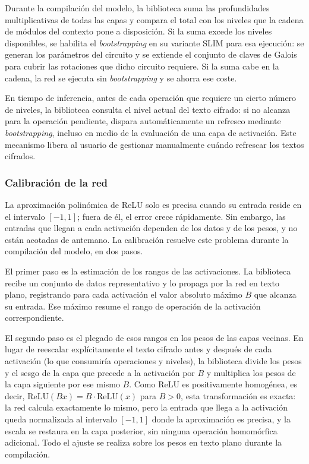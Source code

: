 Durante la compilación del modelo, la biblioteca suma las profundidades multiplicativas de todas las capas y compara el total con los niveles que la cadena de módulos del contexto pone a disposición. Si la suma excede los niveles disponibles, se habilita el \textit{bootstrapping} en su variante SLIM para esa ejecución: se generan los parámetros del circuito y se extiende el conjunto de claves de Galois para cubrir las rotaciones que dicho circuito requiere. Si la suma cabe en la cadena, la red se ejecuta sin \textit{bootstrapping} y se ahorra ese coste.

En tiempo de inferencia, antes de cada operación que requiere un cierto número de niveles, la biblioteca consulta el nivel actual del texto cifrado: si no alcanza para la operación pendiente, dispara automáticamente un refresco mediante \textit{bootstrapping}, incluso en medio de la evaluación de una capa de activación. Este mecanismo libera al usuario de gestionar manualmente cuándo refrescar los textos cifrados.

\subsubsection{Calibración de la red}\label{sec:metodo_calibracion}

La aproximación polinómica de ReLU solo es precisa cuando su entrada reside en el intervalo $[-1, 1]$; fuera de él, el error crece rápidamente. Sin embargo, las entradas que llegan a cada activación dependen de los datos y de los pesos, y no están acotadas de antemano. La calibración resuelve este problema durante la compilación del modelo, en dos pasos.

El primer paso es la estimación de los rangos de las activaciones. La biblioteca recibe un conjunto de datos representativo y lo propaga por la red en texto plano, registrando para cada activación el valor absoluto máximo $B$ que alcanza su entrada. Ese máximo resume el rango de operación de la activación correspondiente.

El segundo paso es el plegado de esos rangos en los pesos de las capas vecinas. En lugar de reescalar explícitamente el texto cifrado antes y después de cada activación (lo que consumiría operaciones y niveles), la biblioteca divide los pesos y el sesgo de la capa que precede a la activación por $B$ y multiplica los pesos de la capa siguiente por ese mismo $B$. Como ReLU es positivamente homogénea, es decir, $\mathrm{ReLU}(Bx) = B \cdot \mathrm{ReLU}(x)$ para $B > 0$, esta transformación es exacta: la red calcula exactamente lo mismo, pero la entrada que llega a la activación queda normalizada al intervalo $[-1, 1]$ donde la aproximación es precisa, y la escala se restaura en la capa posterior, sin ninguna operación homomórfica adicional. Todo el ajuste se realiza sobre los pesos en texto plano durante la compilación.


